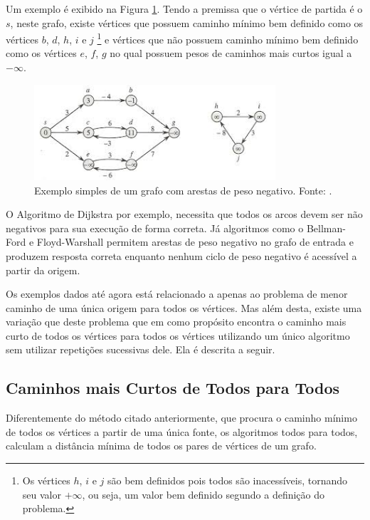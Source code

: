 \documentclass[12pt]{article}
\begin{document}
Um exemplo é exibido na Figura \ref{fig:negativo}. Tendo a premissa que o vértice de partida é o $s$, neste grafo, existe vértices que possuem caminho mínimo bem definido como os vértices $b$, $d$, $h$, $i$ e $j$ \footnote{Os vértices $h$, $i$ e $j$ são bem definidos pois todos são inacessíveis, tornando seu valor $+\infty$, ou seja, um valor bem definido segundo a definição do problema.} e vértices que não possuem caminho mínimo bem definido como os vértices $e$, $f$, $g$ no qual possuem pesos de caminhos mais curtos igual a $-\infty$.

\begin{figure}[H]
  \centering
    \includegraphics[width=0.8\textwidth]{img/negativo2.jpeg}
  \caption{Exemplo simples de um grafo com arestas de peso negativo. Fonte: \cite{cormen2002algoritmos}.}
  \label{fig:negativo}
\end{figure}

O Algoritmo de Dijkstra por exemplo, necessita que todos os arcos devem ser não negativos para sua execução de forma correta. Já algoritmos como o Bellman-Ford e Floyd-Warshall permitem arestas de peso negativo no grafo de entrada e produzem resposta correta enquanto nenhum ciclo de peso negativo é acessível a partir da origem. 

Os exemplos dados até agora está relacionado a apenas ao problema de menor caminho de uma única origem para todos os vértices. Mas além desta, existe uma variação  que deste problema que em como propósito encontra o caminho mais curto de todos os vértices para todos os vértices utilizando um único algoritmo sem utilizar repetições sucessivas dele. Ela é descrita a seguir.



\subsection{Caminhos mais Curtos de Todos para Todos}

Diferentemente do método citado anteriormente, que procura o caminho mínimo de todos os vértices a partir de uma única fonte, os algoritmos todos para todos, calculam a distância mínima de todos os pares de vértices de um grafo.
\end{document}
